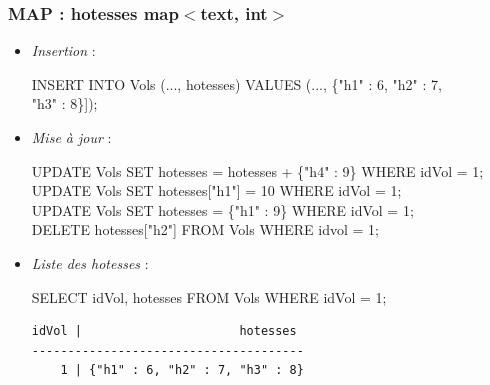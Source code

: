 \begin{frame}[fragile]
	\frametitle{MAP : hotesses map$<$text, int$>$}
	\begin{itemize}
		\item \textit{Insertion} :\color{fondCnamGris3}
		
		\footnotesize
		INSERT INTO Vols (..., hotesses) VALUES (..., \{"h1" : 6, "h2" : 7,\\
		\hspace*{3cm}"h3" : 8\}]);
		\normalsize\color{black}
		
		\item \textit{Mise à jour} :\color{fondCnamGris3}
		
		\footnotesize
		UPDATE Vols SET hotesses = hotesses + \{"h4" : 9\} WHERE idVol = 1;\\
		UPDATE Vols SET hotesses["h1"] = 10 WHERE idVol = 1;\\
		UPDATE Vols SET hotesses = \{"h1" : 9\} WHERE idVol = 1;\\
		DELETE hotesses["h2"] FROM Vols WHERE idvol = 1; 
		\normalsize\color{black}
		
		\item \textit{Liste des hotesses} :\color{fondCnamGris3}
		
		\footnotesize
		SELECT idVol, hotesses FROM Vols WHERE idVol = 1; 
		\normalsize\color{fondCnamGris2}
		\scriptsize
		\begin{verbatim}
idVol |                      hotesses
--------------------------------------
    1 | {"h1" : 6, "h2" : 7, "h3" : 8}
		\end{verbatim}
	\end{itemize}
\end{frame}

